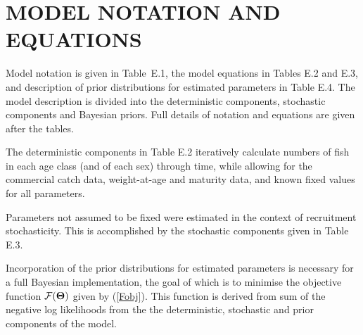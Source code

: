 \documentclass[11pt]{book}
\newcommand{\Fobj}{\mathcal{F}}%
\def\bfTh{{\bf \Theta}}%
\newcommand{\comment}[1]{}                    %
\def\AppLet{E}                   %
\def\bfTh{{\bf \Theta}}          %
\newcommand{\eref}[1]{(\ref{#1})}
\begin{document}
\section{MODEL NOTATION AND EQUATIONS}

Model notation is given in Table~\AppLet.1, the model equations in Tables \AppLet.2 and \AppLet.3, and description of prior distributions for estimated parameters in Table \AppLet.4. The model description is divided into the deterministic components, stochastic components and Bayesian priors. Full details of notation and equations are given after the tables. %

The deterministic components in Table \AppLet.2 iteratively calculate numbers of fish in each age class (and of each sex) through time, while allowing for the commercial catch data, weight-at-age and maturity data, and known fixed values for all parameters.

Parameters not assumed to be fixed were estimated in the context of recruitment stochasticity.
This is accomplished by the stochastic components given in Table \AppLet.3. 

Incorporation of the prior distributions for estimated parameters is necessary for a full Bayesian implementation, the goal of which is to minimise the objective function $\Fobj(\bfTh)$ given by \eref{Fobj}. 
This function is derived from sum of the negative log likelihoods from the the deterministic, stochastic and prior components of the model. %

\newpage


\setlength\tabcolsep{0pt}


\comment{
NA
}
\end{document}
